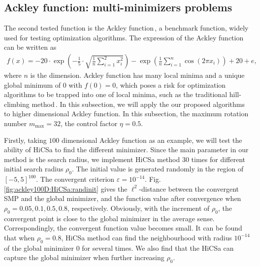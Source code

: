 \documentclass[final,1p,times]{elsarticle}
\begin{document}
\newpage

\subsection{Ackley function: multi-minimizers problems}
\label{subsec:minmulit}

The second tested function is the Ackley
function\,\cite{dieterich2012empirical},
a benchmark function, widely used for
testing optimization algorithms.
The expression of the Ackley function can be written as
\begin{align}
	f(x) =
	-20\cdot\exp\left(-\frac{1}{5}\cdot\sqrt{\frac{1}{n}\sum_{i=1}^2
	x_i^2}\right)-
	\exp\left(\frac{1}{n}\sum_{i=1}^n \cos(2\pi x_i)\right)+20+e,
	\label{eqn:ackley}
\end{align}
where $n$ is the dimension.
Ackley function has many local minima and a unique global
minimum of $0$ with $f(0)=0$, which poses a risk for
optimization algorithms to be trapped into one of local
minima, such as the traditional hill-climbing method\,\cite{back1996evolutionary}.
In this subsection, we will apply the our proposed 
algorithms to higher dimensional Ackley function. 
In this subsection, the maximum rotation number
$m_{\max}=32$, the control factor $\eta=0.5$.

\newpage

Firstly, taking $100$ dimensional Ackley function as an example, 
we will test the ability of HiCSa to find the different minimizer.
Since the main parameter in our method is the search radius,  
we implement HiCSa method $30$ times for different
initial search radius $\rho_0$. The initial value is generated
randomly in the region of $[-5,5]^{100}$. 
The convergent criterion $\varepsilon=10^{-14}$.
Fig.\,\ref{fig:ackley100D:HiCSa:randinit} gives the 
$\ell^2$-distance between the convergent SMP and the global minimizer, and
the function value after convergence when $\rho_0=0.05, 0.1, 0.5,
0.8$, respectively. Obviously, with the increment of $\rho_0$,
the convergent point is close to the global minimizer in the
average sense. Correspondingly, the convergent function value
becomes small. It can be found that when $\rho_0=0.8$, HiCSa
method can find the neighbourhood with radius $10^{-14}$ of the
global minimizer $0$ for several times. We also find that the
HiCSa can capture the global minimizer when further increasing
$\rho_0$.
\end{document}
